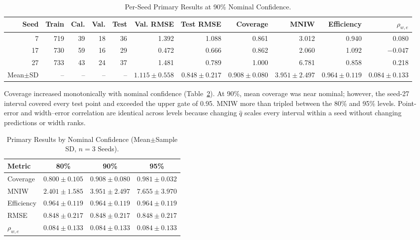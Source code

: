 \documentclass[lettersize,journal]{IEEEtran}
\begin{document}
\begin{table}[!t]
\caption{Per-Seed Primary Results at 90\% Nominal Confidence.}
\label{tab:seed}
\centering
\setlength{\tabcolsep}{5pt}
\begin{tabular}{rrrrrrrrrrr}
\toprule
Seed & Train & Cal. & Val. & Test & Val. RMSE & Test RMSE & Coverage & MNIW & Efficiency & $\rho_{w,e}$ \\
\midrule
7  & 719 & 39 & 18 & 36 & 1.392 & 1.088 & 0.861 & 3.012 & 0.940 & 0.080 \\
17 & 730 & 59 & 16 & 29 & 0.472 & 0.666 & 0.862 & 2.060 & 1.092 & $-0.047$ \\
27 & 733 & 43 & 24 & 37 & 1.481 & 0.789 & 1.000 & 6.781 & 0.858 & 0.218 \\
\midrule
Mean$\pm$SD & -- & -- & -- & -- & $1.115\pm0.558$ & $0.848\pm0.217$ & $0.908\pm0.080$ & $3.951\pm2.497$ & $0.964\pm0.119$ & $0.084\pm0.133$ \\
\bottomrule
\end{tabular}
\end{table}

Coverage increased monotonically with nominal confidence (Table~\ref{tab:levels}). At 90\%, mean coverage was near nominal; however, the seed-27 interval covered every test point and exceeded the upper gate of 0.95. MNIW more than tripled between the 80\% and 95\% levels. Point-error and width--error correlation are identical across levels because changing $\hat q$ scales every interval within a seed without changing predictions or width ranks.

\begin{table}[!t]
\caption{Primary Results by Nominal Confidence (Mean$\pm$Sample SD, $n=3$ Seeds).}
\label{tab:levels}
\centering
\begin{tabular}{lccc}
\toprule
Metric & 80\% & 90\% & 95\% \\
\midrule
Coverage & $0.800\pm0.105$ & $0.908\pm0.080$ & $0.981\pm0.032$ \\
MNIW & $2.401\pm1.585$ & $3.951\pm2.497$ & $7.655\pm3.970$ \\
Efficiency & $0.964\pm0.119$ & $0.964\pm0.119$ & $0.964\pm0.119$ \\
RMSE & $0.848\pm0.217$ & $0.848\pm0.217$ & $0.848\pm0.217$ \\
$\rho_{w,e}$ & $0.084\pm0.133$ & $0.084\pm0.133$ & $0.084\pm0.133$ \\
\bottomrule
\end{tabular}
\end{table}
\end{document}

